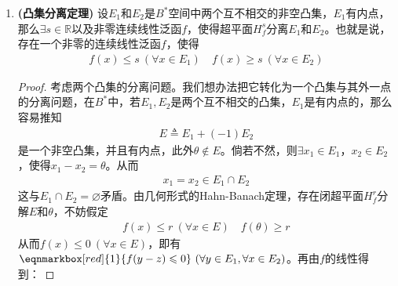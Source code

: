 \begin{enumerate}[leftmargin=2cm, label=\arabic*]
    \begin{proof}
        设$\mathscr{X}$为$B^*$空间，如果$E$是$\mathscr{X}$的以$\theta$为内点的真凸子集，则它的Minkowski泛函$p(x)$便是一个非零的连续次线性泛函，满足
        \begin{align*}
            \forall x\in E\Longrightarrow p(x)\leqslant 1
        \end{align*}
        如果还存在一点$x_0\in\mathscr{X}\backslash E$，则由$p(x)$的定义可以得到$p(x_0)\geqslant 1$。下面证明存在超平面分离$x_0$和$E$。先在一维线性空间$\mathscr{X}_0 \triangleq \{\lambda x_0\mid \lambda\in\mathbb{R}\}$上定义$f_0(\lambda x_0) \triangleq \lambda p(x_0)$。显然$f_0$是$\mathscr{X}_0$上的线性泛函，满足
        \begin{align*}
            f_0(x) = f_0(\lambda x_0) = \lambda p(x_0) \leqslant p(\lambda x_0) = p(x) \quad (\forall x\in\mathscr{X}_0)
        \end{align*}
        由实形式的Hahn-Banach定理，必然存在$\mathscr{X}$上的线性泛函$f(x)$满足
        \begin{align*}
            f(x_0) &= f_0(x_0) = p(x_0)\geqslant 1\\
            f(x) &\leqslant p(x)\leqslant 1 \quad (\forall x\in\mathscr{X})
        \end{align*}
        则$f(x)\leqslant 1\ (\forall x\in E)$，故而定义的$f$分离$x_0$与$E$。
    \end{proof}
    \item \textbf{(凸集分离定理)} 设$E_1$和$E_2$是$B^*$空间中两个互不相交的非空凸集，$E_1$有内点，那么$\exists s\in\mathbb{R}$以及非零连续线性泛函$f$，使得超平面$H_f^s$分离$E_1$和$E_2$。也就是说，存在一个非零的连续线性泛函$f$，使得
    \begin{align*}
        f(x)\leqslant s\ (\forall x\in E_1) \quad f(x)\geqslant s\ (\forall x\in E_2)
    \end{align*}

    \begin{proof}
    考虑两个凸集的分离问题。我们想办法把它转化为一个凸集与其外一点的分离问题，在$B^*$中，若$E_1,E_2$是两个互不相交的凸集，$E_1$是有内点的，那么容易推知
    \begin{align*}
        E \triangleq E_1 + (-1)E_2
    \end{align*}
    是一个非空凸集，并且有内点，此外$\theta\notin E$。倘若不然，则$\exists x_1\in E_1$，$x_2\in E_2$，使得$x_1 - x_2 = \theta$。从而
    \begin{align*}
        x_1 = x_2 \in E_1\cap E_2
    \end{align*}
    这与$E_1\cap E_2= \varnothing$矛盾。由几何形式的Hahn-Banach定理，存在闭超平面$H_f^r$分解$E$和$\theta$，不妨假定
    \begin{align*}
        f(x)\leqslant r\ (\forall x\in E) \quad f(\theta)\geqslant r
    \end{align*}
    从而$f(x)\leqslant 0\ (\forall x\in E)$，即有$\eqnmarkbox[red]{1}{f(y-z) \leqslant 0}\ (\forall y\in E_1,\forall x\in E_2)$。再由$f$的线性得到：
    \vspace{0.5em}
    

\end{proof}
\end{enumerate}
